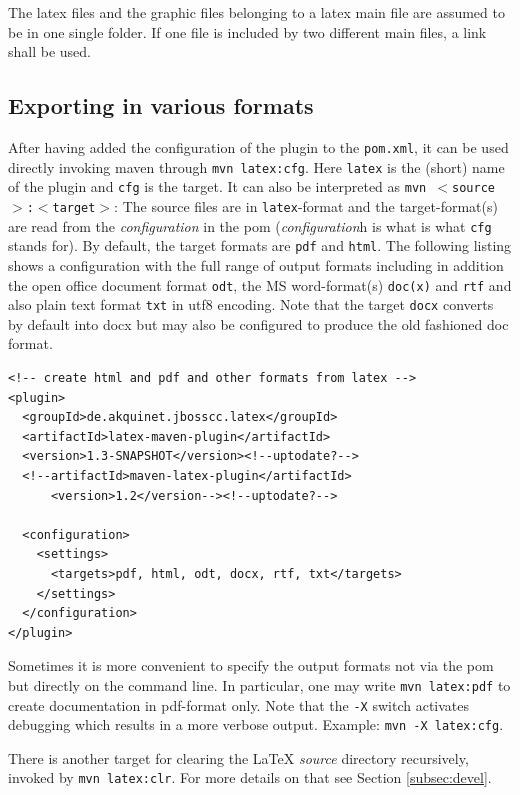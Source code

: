 \documentclass[12pt]{article}
\begin{document}
The latex files and the graphic files belonging to a latex main file 
are assumed to be in one single folder. 
If one file is included by two different main files, 
a link shall be used. 


\subsection{Exporting in various formats}\label{sec:stableUsage}


After having added the configuration of the plugin to the {\tt pom.xml}, 
it can be used directly invoking maven through 
{\tt mvn latex:cfg}. 
Here {\tt latex} is the (short) name of the plugin and {\tt cfg} is the target. 
It can also be interpreted as {\tt mvn $<$source$>$:$<$target$>$}: 
The source files are in {\tt latex}-format and the target-format(s) 
are read from the {\em configuration} in the pom 
({\em configuration}h is what is what {\tt cfg} stands for). 
By default, the target formats are {\tt pdf} and {\tt html}. 
The following listing shows a configuration 
with the full range of output formats including in addition 
the open office document format {\tt odt}, 
the MS word-format(s) {\tt doc(x)} and {\tt rtf}
and also plain text format {\tt txt} in utf8 encoding. 
Note that the target {\tt docx} converts by default into \gls{docx} 
but may also be configured to produce the old fashioned \gls{doc} format. 
%
\lstset{language=xml, basicstyle=\small}
\begin{lstlisting}
<!-- create html and pdf and other formats from latex -->
<plugin>
  <groupId>de.akquinet.jbosscc.latex</groupId>
  <artifactId>latex-maven-plugin</artifactId>
  <version>1.3-SNAPSHOT</version><!--uptodate?-->
  <!--artifactId>maven-latex-plugin</artifactId>
      <version>1.2</version--><!--uptodate?-->
	
  <configuration>
    <settings>
      <targets>pdf, html, odt, docx, rtf, txt</targets>
    </settings>
  </configuration>
</plugin>
\end{lstlisting}

Sometimes it is more convenient 
to specify the output formats not via the pom 
but directly on the command line. 
In particular, one may write {\tt mvn latex:pdf} to create documentation 
in pdf-format only. 
Note that the {\tt -X} switch activates debugging 
which results in a more verbose output. 
Example: {\tt mvn -X latex:cfg}. 

There is another target for clearing the LaTeX {\em source} directory 
recursively, invoked by {\tt mvn latex:clr}. 
For more details on that see Section \ref{subsec:devel}. 
\end{document}

